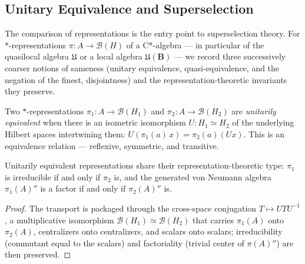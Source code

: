 \subsection{Unitary Equivalence and Superselection}

The comparison of representations is the entry point to superselection theory. For $*$-representations $\pi : A \to \mathcal{B}(H)$ of a C*-algebra --- in particular of the quasilocal algebra $\mathfrak{U}$ or a local algebra $\mathfrak{U}(\mathbf{B})$ --- we record three successively coarser notions of sameness (unitary equivalence, quasi-equivalence, and the negation of the finest, disjointness) and the representation-theoretic invariants they preserve.

\begin{definition}
    \label{def:unitary-equivalence}
    \leanok
    Two $*$-representations $\pi_1 : A \to \mathcal{B}(H_1)$ and $\pi_2 : A \to \mathcal{B}(H_2)$ are \emph{unitarily equivalent} when there is an isometric isomorphism $U : H_1 \simeq H_2$ of the underlying Hilbert spaces intertwining them: $U(\pi_1(a)\,x) = \pi_2(a)(U x)$. This is an equivalence relation --- reflexive, symmetric, and transitive.
\end{definition}

\begin{theorem}
    \label{thrm:unitary-equiv-invariants}
    \leanok
    Unitarily equivalent representations share their representation-theoretic type: $\pi_1$ is irreducible if and only if $\pi_2$ is, and the generated von Neumann algebra $\pi_1(A)''$ is a factor if and only if $\pi_2(A)''$ is.
\end{theorem}
\begin{proof}
    \leanok
    The transport is packaged through the cross-space conjugation $T \mapsto U T U^{-1}$, a multiplicative isomorphism $\mathcal{B}(H_1) \simeq \mathcal{B}(H_2)$ that carries $\pi_1(A)$ onto $\pi_2(A)$, centralizers onto centralizers, and scalars onto scalars; irreducibility (commutant equal to the scalars) and factoriality (trivial center of $\pi(A)''$) are then preserved.
\end{proof}

